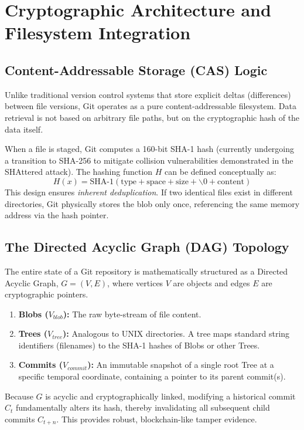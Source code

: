 \section{Cryptographic Architecture and Filesystem Integration}

\subsection{Content-Addressable Storage (CAS) Logic}
Unlike traditional version control systems that store explicit deltas (differences) between file versions, Git operates as a pure content-addressable filesystem. Data retrieval is not based on arbitrary file paths, but on the cryptographic hash of the data itself.

When a file is staged, Git computes a 160-bit SHA-1 hash (currently undergoing a transition to SHA-256 to mitigate collision vulnerabilities demonstrated in the SHAttered attack). The hashing function $H$ can be defined conceptually as:
$$ H(x) = \text{SHA-1}(\text{type} + \text{space} + \text{size} + \backslash 0 + \text{content}) $$
This design ensures \textit{inherent deduplication}. If two identical files exist in different directories, Git physically stores the blob only once, referencing the same memory address via the hash pointer.

\newpage
\subsection{The Directed Acyclic Graph (DAG) Topology}
The entire state of a Git repository is mathematically structured as a Directed Acyclic Graph, $G = (V, E)$, where vertices $V$ are objects and edges $E$ are cryptographic pointers. 

\begin{enumerate}
    \item \textbf{Blobs ($V_{blob}$):} The raw byte-stream of file content.
    \item \textbf{Trees ($V_{tree}$):} Analogous to UNIX directories. A tree maps standard string identifiers (filenames) to the SHA-1 hashes of Blobs or other Trees.
    \item \textbf{Commits ($V_{commit}$):} An immutable snapshot of a single root Tree at a specific temporal coordinate, containing a pointer to its parent commit(s).
\end{enumerate}
Because $G$ is acyclic and cryptographically linked, modifying a historical commit $C_t$ fundamentally alters its hash, thereby invalidating all subsequent child commits $C_{t+n}$. This provides robust, blockchain-like tamper evidence.

